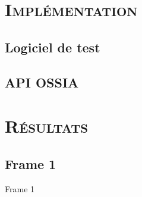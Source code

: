 

\section{\scshape Implémentation}
\subsection{Logiciel de test}
\subsection{API OSSIA}

\section{\scshape Résultats}
\subsection{Frame 1}
\begin{frame}{Frame 1}

\end{frame}
